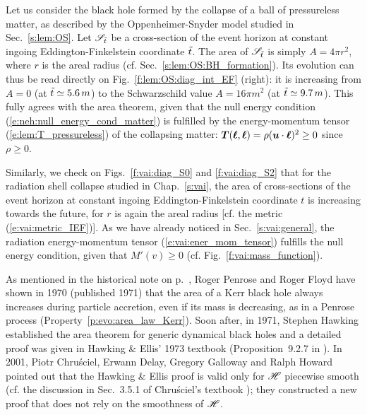 \begin{example}
Let us consider the black hole formed by the collapse
of a ball of pressureless matter, as described by the Oppenheimer-Snyder
model studied in Sec.~\ref{s:lem:OS}. Let $\mathscr{S}_{{\tilde t}}$ be a
cross-section of the event horizon at constant ingoing Eddington-Finkelstein coordinate ${\tilde t}$.
The area of $\mathscr{S}_{{\tilde t}}$ is simply $A = 4\pi r^2$,
where $r$ is the areal radius (cf. Sec.~\ref{s:lem:OS:BH_formation}). Its
evolution can thus be read directly on Fig.~\ref{f:lem:OS:diag_int_EF} (right):
it is increasing from $A = 0$ (at ${\tilde t}\simeq 5.6\, m$) to the Schwarzschild
value $A = 16\pi m^2$ (at ${\tilde t}\simeq 9.7\, m$). This fully agrees
with the area theorem, given that the null energy condition (\ref{e:neh:null_energy_cond_matter})
is fulfilled by the energy-momentum tensor (\ref{e:lem:T_pressureless}) of the collapsing matter: $\bm{T}(\bm{\ell},\bm{\ell}) =  \rho (\bm{u}\cdot\bm{\ell})^2 \geq 0$ since $\rho \geq 0$.
\end{example}

\begin{example}
Similarly, we check on Figs.~\ref{f:vai:diag_S0} and \ref{f:vai:diag_S2}
that for the radiation shell collapse studied in Chap.~\ref{s:vai},
the area of cross-sections of the event horizon
at constant ingoing Eddington-Finkelstein coordinate $t$
is increasing towards the future, for $r$ is again the areal radius
[cf. the metric (\ref{e:vai:metric_IEF})]. As we have already noticed in
Sec.~\ref{s:vai:general}, the radiation energy-momentum tensor (\ref{e:vai:ener_mom_tensor})
fulfills the null energy condition, given that $M'(v) \geq 0$ (cf. Fig.~\ref{f:vai:mass_function}).
\end{example}


\begin{hist} \label{h:evo:area_increase}
As mentioned in the historical note on p.~\pageref{h:evo:irreducible_mass},
Roger Penrose
and Roger Floyd \cite{PenroF71}
have shown in 1970 (published 1971)
that the area of a Kerr black hole always increases during particle accretion,
even if its mass is decreasing, as in a Penrose process (Property~\ref{p:evo:area_law_Kerr}).
Soon after, in 1971, Stephen Hawking
\cite{Hawki71} established the area theorem for generic
dynamical black holes and a detailed proof was given in
Hawking \& Ellis' 1973 textbook (Proposition~9.2.7 in \cite{HawkiE73}).
In 2001, Piotr Chru\'sciel,
Erwann Delay,
Gregory Galloway and Ralph Howard
\cite{ChrusDGH01} pointed out that the Hawking \& Ellis proof is
valid only for $\mathscr{H}$ piecewise smooth (cf. the
discussion in Sec.~3.5.1 of Chru\'sciel's textbook \cite{Chrus20}); they constructed
a new proof that does not rely on the smoothness of $\mathscr{H}$.
\end{hist}

